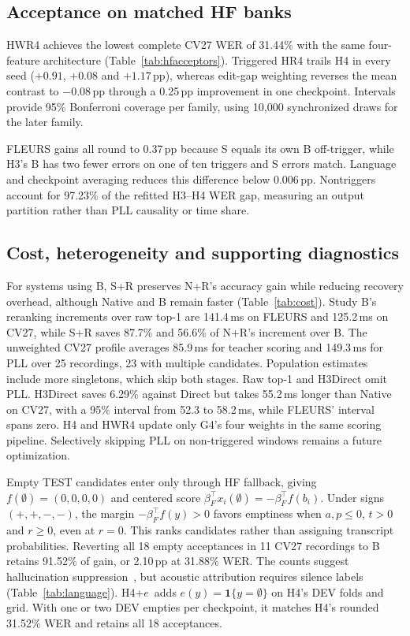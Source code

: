 \subsection{Acceptance on matched HF banks}

HWR4 achieves the lowest complete CV27 WER of 31.44\% with the same four-feature architecture (Table~\ref{tab:hfacceptors}). Triggered HR4 trails H4 in every seed ($+0.91$, $+0.08$ and $+1.17$\,pp), whereas edit-gap weighting reverses the mean contrast to $-0.08$\,pp through a 0.25\,pp improvement in one checkpoint. Intervals provide 95\% Bonferroni coverage per family, using 10,000 synchronized draws for the later family.

FLEURS gains all round to 0.37\,pp because S equals its own B off-trigger, while H3's B has two fewer errors on one of ten triggers and S errors match. Language and checkpoint averaging reduces this difference below 0.006\,pp. Nontriggers account for 97.23\% of the refitted H3--H4 WER gap, measuring an output partition rather than PLL causality or time share.

\subsection{Cost, heterogeneity and supporting diagnostics}

For systems using B, S+R preserves N+R's accuracy gain while reducing recovery overhead, although Native and B remain faster (Table~\ref{tab:cost}). Study B's reranking increments over raw top-1 are 141.4\,ms on FLEURS and 125.2\,ms on CV27, while S+R saves 87.7\% and 56.6\% of N+R's increment over B. The unweighted CV27 profile averages 85.9\,ms for teacher scoring and 149.3\,ms for PLL over 25 recordings, 23 with multiple candidates. Population estimates include more singletons, which skip both stages. Raw top-1 and H3Direct omit PLL. H3Direct saves 6.29\% against Direct but takes 55.2\,ms longer than Native on CV27, with a 95\% interval from 52.3 to 58.2\,ms, while FLEURS' interval spans zero. H4 and HWR4 update only G4's four weights in the same scoring pipeline. Selectively skipping PLL on non-triggered windows remains a future optimization.


Empty TEST candidates enter only through HF fallback, giving $f(\emptyset)=(0,0,0,0)$ and centered score $\beta_F^\top x_i(\emptyset)=-\beta_F^\top f(b_i)$. Under signs $(+,+,-,-)$, the margin $-\beta_F^\top f(y)>0$ favors emptiness when $a,p\le0$, $t>0$ and $r\ge0$, even at $r=0$. This ranks candidates rather than assigning transcript probabilities. Reverting all 18 empty acceptances in 11 CV27 recordings to B retains 91.52\% of gain, or 2.10\,pp at 31.88\% WER. The counts suggest hallucination suppression~\cite{baranski2025nonspeech}, but acoustic attribution requires silence labels (Table~\ref{tab:language}). \mbox{H4+$e$ adds} $e(y)=\mathbf1\{y=\emptyset\}$ on H4's DEV folds and grid. With one or two DEV empties per checkpoint, it matches H4's rounded 31.52\% WER and retains all 18 acceptances.

